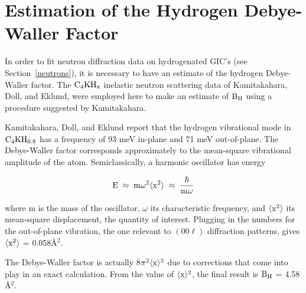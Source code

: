 \chapter{Estimation of the Hydrogen Debye-Waller Factor}
\label{hydrogdw}
\pagestyle{headings}

        In order to fit neu\-tron diff\-rac\-tion da\-ta on hy\-dro\-gen\-ated GIC's (see
Section~\ref{neutrons}),   it is   necessary  to have  an estimate   of the
hydrogen  Debye-Waller    factor.   The $\rm   C_4KH_x$   in\-el\-ast\-ic neu\-tron
scat\-ter\-ing data  of  Kamitakahara,   Doll, and Eklund,\cite{solin88}   were
employed here to make an estimate of  $\rm B_H$ using a procedure suggested
by Kamitakahara.\cite{kamitakahara88}

        
        Kamitakahara, Doll,  and    Eklund\cite{solin88} report  that   the
hydrogen vibrational  mode in $\rm C_4KH_{0.8}$  has a frequency  of 93 meV
in-plane and  71   meV  out-of-plane.  The Debye-Waller  factor corresponds
approximately to the mean-square vibrational amplitude of the
atom.\cite{ashcroft76}  Semiclassically, a harmonic oscillator has  energy

\[ \rm E \; \approx \; m \omega^2 \langle x^2 \rangle  \; \approx \; \frac{\hbar}{m \omega}
\]

\noindent where m is the mass of the oscillator,  $\omega$ its characteristic
 frequency, and  $\rm \langle x^2  \rangle$ its mean-square  displacement,
the quantity  of interest.  Plugging  in the numbers for  the  out-of-plane
vibration, the one relevant to $(00\ell)$ diffraction patterns,  gives $\rm
\langle x^2 \rangle$ = 0.058\AA$^2$.

        The Debye-Waller factor is  actually 8$\rm \pi^2 \langle  x \rangle
^2$     due  to  corrections   that   come   into    play    in  an   exact
calculation.\cite{ashcroft76} From the value of $\rm \langle x \rangle ^2$,
the final result is $\rm B_H$ = 4.58 \AA$^2$.
